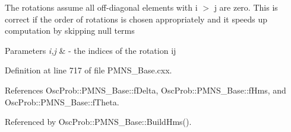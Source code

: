 The rotations assume all off-\/diagonal elements with i $>$ j are zero. This is correct if the order of rotations is chosen appropriately and it speeds up computation by skipping null terms


\begin{DoxyParams}{Parameters}
{\em i,j} & -\/ the indices of the rotation ij \\
\hline
\end{DoxyParams}


Definition at line 717 of file P\+M\+N\+S\+\_\+\+Base.\+cxx.



References Osc\+Prob\+::\+P\+M\+N\+S\+\_\+\+Base\+::f\+Delta, Osc\+Prob\+::\+P\+M\+N\+S\+\_\+\+Base\+::f\+Hms, and Osc\+Prob\+::\+P\+M\+N\+S\+\_\+\+Base\+::f\+Theta.



Referenced by Osc\+Prob\+::\+P\+M\+N\+S\+\_\+\+Base\+::\+Build\+Hms().


